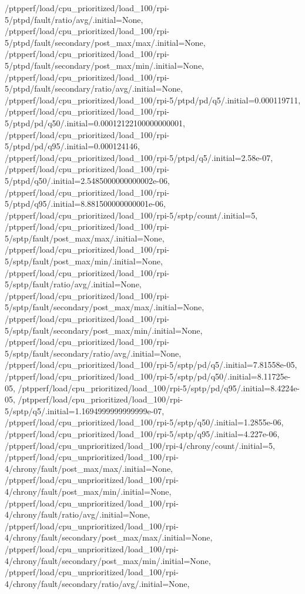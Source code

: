 {    /ptpperf/load/cpu_prioritized/load_100/rpi-5/ptpd/fault/ratio/avg/.initial=None,
    /ptpperf/load/cpu_prioritized/load_100/rpi-5/ptpd/fault/secondary/post_max/max/.initial=None,
    /ptpperf/load/cpu_prioritized/load_100/rpi-5/ptpd/fault/secondary/post_max/min/.initial=None,
    /ptpperf/load/cpu_prioritized/load_100/rpi-5/ptpd/fault/secondary/ratio/avg/.initial=None,
    /ptpperf/load/cpu_prioritized/load_100/rpi-5/ptpd/pd/q5/.initial=0.000119711,
    /ptpperf/load/cpu_prioritized/load_100/rpi-5/ptpd/pd/q50/.initial=0.00012122100000000001,
    /ptpperf/load/cpu_prioritized/load_100/rpi-5/ptpd/pd/q95/.initial=0.000124146,
    /ptpperf/load/cpu_prioritized/load_100/rpi-5/ptpd/q5/.initial=2.58e-07,
    /ptpperf/load/cpu_prioritized/load_100/rpi-5/ptpd/q50/.initial=2.5485000000000002e-06,
    /ptpperf/load/cpu_prioritized/load_100/rpi-5/ptpd/q95/.initial=8.881500000000001e-06,
    /ptpperf/load/cpu_prioritized/load_100/rpi-5/sptp/count/.initial=5,
    /ptpperf/load/cpu_prioritized/load_100/rpi-5/sptp/fault/post_max/max/.initial=None,
    /ptpperf/load/cpu_prioritized/load_100/rpi-5/sptp/fault/post_max/min/.initial=None,
    /ptpperf/load/cpu_prioritized/load_100/rpi-5/sptp/fault/ratio/avg/.initial=None,
    /ptpperf/load/cpu_prioritized/load_100/rpi-5/sptp/fault/secondary/post_max/max/.initial=None,
    /ptpperf/load/cpu_prioritized/load_100/rpi-5/sptp/fault/secondary/post_max/min/.initial=None,
    /ptpperf/load/cpu_prioritized/load_100/rpi-5/sptp/fault/secondary/ratio/avg/.initial=None,
    /ptpperf/load/cpu_prioritized/load_100/rpi-5/sptp/pd/q5/.initial=7.81558e-05,
    /ptpperf/load/cpu_prioritized/load_100/rpi-5/sptp/pd/q50/.initial=8.11725e-05,
    /ptpperf/load/cpu_prioritized/load_100/rpi-5/sptp/pd/q95/.initial=8.4224e-05,
    /ptpperf/load/cpu_prioritized/load_100/rpi-5/sptp/q5/.initial=1.1694999999999999e-07,
    /ptpperf/load/cpu_prioritized/load_100/rpi-5/sptp/q50/.initial=1.2855e-06,
    /ptpperf/load/cpu_prioritized/load_100/rpi-5/sptp/q95/.initial=4.227e-06,
    /ptpperf/load/cpu_unprioritized/load_100/rpi-4/chrony/count/.initial=5,
    /ptpperf/load/cpu_unprioritized/load_100/rpi-4/chrony/fault/post_max/max/.initial=None,
    /ptpperf/load/cpu_unprioritized/load_100/rpi-4/chrony/fault/post_max/min/.initial=None,
    /ptpperf/load/cpu_unprioritized/load_100/rpi-4/chrony/fault/ratio/avg/.initial=None,
    /ptpperf/load/cpu_unprioritized/load_100/rpi-4/chrony/fault/secondary/post_max/max/.initial=None,
    /ptpperf/load/cpu_unprioritized/load_100/rpi-4/chrony/fault/secondary/post_max/min/.initial=None,
    /ptpperf/load/cpu_unprioritized/load_100/rpi-4/chrony/fault/secondary/ratio/avg/.initial=None,
}
